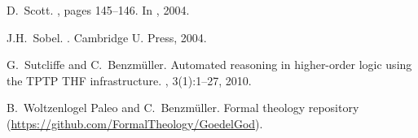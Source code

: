 \documentclass{llncs}
\begin{document}
\begin{thebibliography}{10}
D.~Scott.
, pages 145--146.
\newblock In  \cite{sobel2004logic}, 2004.

J.H.~Sobel.
.
\newblock Cambridge U. Press, 2004.

G.~Sutcliffe and C.~Benzm{\"u}ller.
\newblock Automated reasoning in higher-order logic using the {TPTP THF}
  infrastructure.
, 3(1):1--27, 2010.

B.~Woltzenlogel Paleo and C.~Benzm\"uller.
\newblock Formal theology repository
  (\url{https://github.com/FormalTheology/GoedelGod}).
\end{thebibliography}
\end{document}
